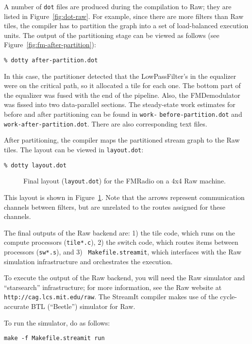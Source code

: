A number of {\tt dot} files are produced during the compilation to
Raw; they are listed in Figure~\ref{fig:dot-raw}.  For example, since
there are more filters than Raw tiles, the compiler has to partition
the graph into a set of load-balanced execution units.  The output of
the partitioning stage can be viewed as follows (see
Figure~\ref{fig:fm-after-partition}): 
%
{\small
\begin{verbatim}
% dotty after-partition.dot
\end{verbatim}
} 
%
In this case, the partitioner detected that the LowPassFilter's in the
equalizer were on the critical path, so it allocated a tile for each
one.  The bottom part of the equalizer was fused with the end of the
pipeline.  Also, the FMDemodulator was fissed into two data-parallel
sections.  The steady-state work estimates for before and after
partitioning can be found in {\tt work-} {\tt before-partition.dot}
and {\tt work-after-partition.dot}.  There are also corresponding text
files.

After partitioning, the compiler maps the partitioned stream graph to
the Raw tiles.  The layout can be viewed in {\tt layout.dot}: 
%
\clearpage
%
{\small
\begin{verbatim}
% dotty layout.dot
\end{verbatim}
} 
\begin{figure}[t]
\caption{\protect\small Final layout ({\tt layout.dot}) for the FMRadio on a 4x4 Raw machine.\protect\label{fig:fm-layout}}
\end{figure}
%
This layout is shown in Figure~\ref{fig:fm-layout}.  Note that the
arrows represent communication channels between filters, but are
unrelated to the routes assigned for these channels.

The final outputs of the Raw backend are: 1) the tile code, which runs
on the compute processors ({\tt tile*.c}), 2) the switch code, which
routes items between processors ({\tt sw*.s}), and 3) {\tt
Makefile.streamit}, which interfaces with the Raw simulation
infrastructure and orchestrates the execution.

  To execute the output of the
Raw backend, you will need the Raw simulator and ``starsearch''
infrastructure; for more information, see the Raw website at {\tt
http://cag.lcs.mit.edu/raw}.  The StreamIt compiler makes use of the
cycle-accurate BTL (``Beetle'') simulator for Raw.

To run the simulator, do as follows:
\begin{verbatim}
make -f Makefile.streamit run
\end{verbatim}

